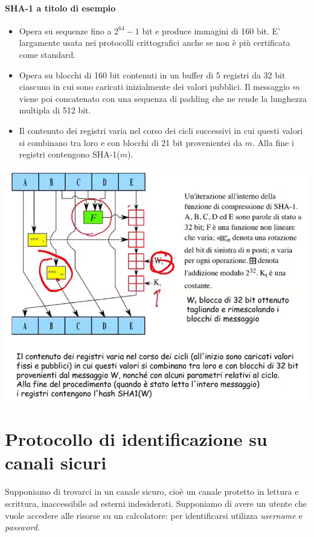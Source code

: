 \paragraph{SHA-1 a titolo di esempio}
\begin{itemize}
	\item 
	Opera su sequenze fino a $2^{64}-1$ bit e produce immagini di 160 bit.
	E' largamente usata nei protocolli crittografici anche se non è più certificata come standard.
	
	\item Opera su blocchi di 160 bit contenuti in un buffer di 5 registri da 32 bit ciascuno in cui sono caricati inizialmente dei valori pubblici.
	Il messaggio $m$ viene poi concatenato con una sequenza di padding che ne rende la lunghezza multipla di 512 bit.
	
	\item Il contenuto dei registri varia nel corso dei cicli successivi in cui questi valori si combinano tra loro e con blocchi di 21 bit provenientei da $m$.
	Alla fine i registri contengono SHA-1($m$).
\end{itemize}
\begin{center}
	\includegraphics[scale=.65]{images/33.PNG}
\end{center}

\section{Protocollo di identificazione su canali sicuri}
Supponiamo di trovarci in un canale sicuro, cioè un canale protetto in lettura e scrittura, inaccessibile ad esterni indesiderati. Supponiamo di avere un utente che vuole accedere alle risorse su un calcolatore: per identificarsi utilizza \emph{username} e \emph{password}.
